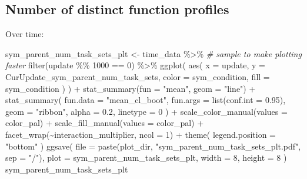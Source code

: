 \documentclass[
]{book}
\newenvironment{Shaded}{\begin{snugshade}}{\end{snugshade}}
\newcommand{\AttributeTok}[1]{\textcolor[rgb]{0.77,0.63,0.00}{#1}}
\newcommand{\CommentTok}[1]{\textcolor[rgb]{0.56,0.35,0.01}{\textit{#1}}}
\newcommand{\DecValTok}[1]{\textcolor[rgb]{0.00,0.00,0.81}{#1}}
\newcommand{\FloatTok}[1]{\textcolor[rgb]{0.00,0.00,0.81}{#1}}
\newcommand{\FunctionTok}[1]{\textcolor[rgb]{0.00,0.00,0.00}{#1}}
\newcommand{\NormalTok}[1]{#1}
\newcommand{\OtherTok}[1]{\textcolor[rgb]{0.56,0.35,0.01}{#1}}
\newcommand{\SpecialCharTok}[1]{\textcolor[rgb]{0.00,0.00,0.00}{#1}}
\newcommand{\StringTok}[1]{\textcolor[rgb]{0.31,0.60,0.02}{#1}}
\begin{document}
\hypertarget{number-of-distinct-function-profiles-9}{%
\subsection{Number of distinct function profiles}\label{number-of-distinct-function-profiles-9}}

Over time:

\begin{Shaded}
\begin{Highlighting}[]
\NormalTok{sym\_parent\_num\_task\_sets\_plt }\OtherTok{\textless{}{-}}\NormalTok{ time\_data }\SpecialCharTok{\%\textgreater{}\%}
  \CommentTok{\# sample to make plotting faster}
  \FunctionTok{filter}\NormalTok{(update }\SpecialCharTok{\%\%} \DecValTok{1000} \SpecialCharTok{==} \DecValTok{0}\NormalTok{) }\SpecialCharTok{\%\textgreater{}\%}
  \FunctionTok{ggplot}\NormalTok{(}
    \FunctionTok{aes}\NormalTok{(}
      \AttributeTok{x =}\NormalTok{ update,}
      \AttributeTok{y =}\NormalTok{ CurUpdate\_sym\_parent\_num\_task\_sets,}
      \AttributeTok{color =}\NormalTok{ sym\_condition,}
      \AttributeTok{fill =}\NormalTok{ sym\_condition}
\NormalTok{    )}
\NormalTok{  ) }\SpecialCharTok{+}
  \FunctionTok{stat\_summary}\NormalTok{(}\AttributeTok{fun =} \StringTok{"mean"}\NormalTok{, }\AttributeTok{geom =} \StringTok{"line"}\NormalTok{) }\SpecialCharTok{+}
  \FunctionTok{stat\_summary}\NormalTok{(}
    \AttributeTok{fun.data =} \StringTok{"mean\_cl\_boot"}\NormalTok{,}
    \AttributeTok{fun.args =} \FunctionTok{list}\NormalTok{(}\AttributeTok{conf.int =} \FloatTok{0.95}\NormalTok{),}
    \AttributeTok{geom =} \StringTok{"ribbon"}\NormalTok{,}
    \AttributeTok{alpha =} \FloatTok{0.2}\NormalTok{,}
    \AttributeTok{linetype =} \DecValTok{0}
\NormalTok{  ) }\SpecialCharTok{+}
  \FunctionTok{scale\_color\_manual}\NormalTok{(}\AttributeTok{values =}\NormalTok{ color\_pal) }\SpecialCharTok{+}
  \FunctionTok{scale\_fill\_manual}\NormalTok{(}\AttributeTok{values =}\NormalTok{ color\_pal) }\SpecialCharTok{+}
  \FunctionTok{facet\_wrap}\NormalTok{(}\SpecialCharTok{\textasciitilde{}}\NormalTok{interaction\_multiplier, }\AttributeTok{ncol =} \DecValTok{1}\NormalTok{) }\SpecialCharTok{+}
  \FunctionTok{theme}\NormalTok{(}
    \AttributeTok{legend.position =} \StringTok{"bottom"}
\NormalTok{  )}
\FunctionTok{ggsave}\NormalTok{(}
  \AttributeTok{file =} \FunctionTok{paste}\NormalTok{(plot\_dir, }\StringTok{"sym\_parent\_num\_task\_sets\_plt.pdf"}\NormalTok{, }\AttributeTok{sep =} \StringTok{"/"}\NormalTok{),}
  \AttributeTok{plot =}\NormalTok{ sym\_parent\_num\_task\_sets\_plt,}
  \AttributeTok{width =} \DecValTok{8}\NormalTok{,}
  \AttributeTok{height =} \DecValTok{8}
\NormalTok{)}
\NormalTok{sym\_parent\_num\_task\_sets\_plt}
\end{Highlighting}
\end{Shaded}
\end{document}
